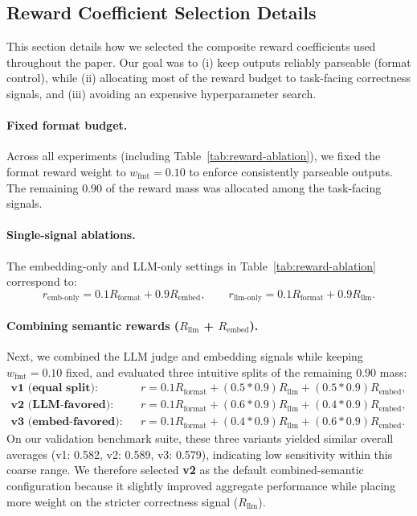 \documentclass{article}
\theoremstyle{plain}
\theoremstyle{definition}
\theoremstyle{remark}
\begin{document}
\subsection{Reward Coefficient Selection Details}
\label{app:reward-coef-selection}

This section details how we selected the composite reward coefficients used throughout the paper. Our goal was to (i) keep outputs reliably parseable (format control), while (ii) allocating most of the reward budget to task-facing correctness signals, and (iii) avoiding an expensive hyperparameter search.

\paragraph{Fixed format budget.}
Across all experiments (including Table~\ref{tab:reward-ablation}), we fixed the format reward weight to $w_{\text{fmt}}=0.10$ to enforce consistently parseable outputs. The remaining $0.90$ of the reward mass was allocated among the task-facing signals.

\paragraph{Single-signal ablations.}
The embedding-only and LLM-only settings in Table~\ref{tab:reward-ablation} correspond to:
\[
r_{\text{emb-only}} = 0.1R_{\text{format}} + 0.9R_{\text{embed}},\qquad
r_{\text{llm-only}} = 0.1R_{\text{format}} + 0.9R_{\text{llm}}.
\]

\paragraph{Combining semantic rewards ($R_{\text{llm}}$ + $R_{\text{embed}}$).}
Next, we combined the LLM judge and embedding signals while keeping $w_{\text{fmt}}=0.10$ fixed, and evaluated three intuitive splits of the remaining $0.90$ mass:
\[
\begin{aligned}
\textbf{v1 (equal split):}\quad & r = 0.1R_{\text{format}} + (0.5*0.9)R_{\text{llm}} + (0.5*0.9)R_{\text{embed}},\\
\textbf{v2 (LLM-favored):}\quad & r = 0.1R_{\text{format}} + (0.6*0.9)R_{\text{llm}} + (0.4*0.9)R_{\text{embed}},\\
\textbf{v3 (embed-favored):}\quad & r = 0.1R_{\text{format}} + (0.4*0.9)R_{\text{llm}} + (0.6*0.9)R_{\text{embed}}.
\end{aligned}
\]
On our validation benchmark suite, these three variants yielded similar overall averages (v1: 0.582, v2: 0.589, v3: 0.579), indicating low sensitivity within this coarse range. We therefore selected \textbf{v2} as the default combined-semantic configuration because it slightly improved aggregate performance while placing more weight on the stricter correctness signal ($R_{\text{llm}}$).
\end{document}
